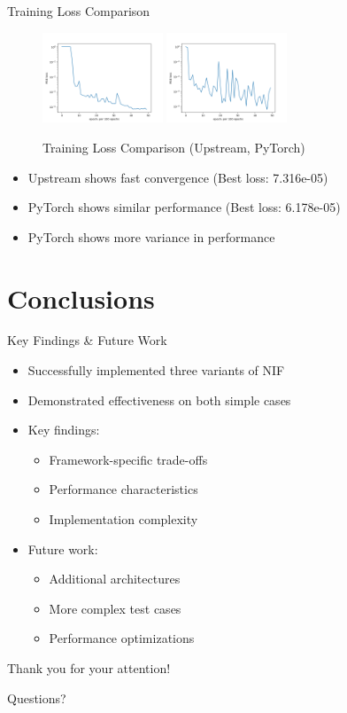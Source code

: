 \documentclass{beamer}
\begin{document}
\begin{frame}{Training Loss Comparison}
    \begin{figure}
        \includegraphics[width=0.32\textwidth]{upstream_loss.png}
        \includegraphics[width=0.32\textwidth]{torch_loss.png}
        \caption{Training Loss Comparison (Upstream, PyTorch)}
    \end{figure}
    \begin{itemize}
        \item Upstream shows fast convergence (Best loss: 7.316e-05)
        \item PyTorch shows similar performance (Best loss: 6.178e-05)
        \item PyTorch shows more variance in performance
    \end{itemize}
\end{frame}

\section{Conclusions}
\begin{frame}{Key Findings \& Future Work}
    \begin{itemize}
        \item Successfully implemented three variants of NIF
        \item Demonstrated effectiveness on both simple cases
        \item Key findings:
        \begin{itemize}
            \item Framework-specific trade-offs
            \item Performance characteristics
            \item Implementation complexity
        \end{itemize}
        \item Future work:
        \begin{itemize}
            \item Additional architectures
            \item More complex test cases
            \item Performance optimizations
        \end{itemize}
    \end{itemize}
\end{frame}

\begin{frame}
    \centering
    \Huge Thank you for your attention!
    
    \vspace{1cm}
    \Large Questions?
\end{frame}
\end{document}
